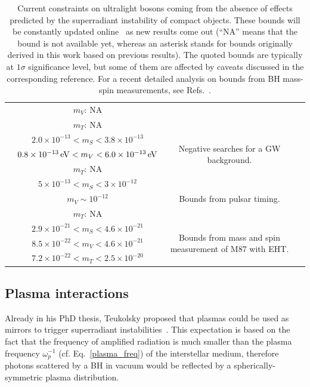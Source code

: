\documentclass[11pt]{article}
\numberwithin{equation}{section} %
\begin{document}
\begin{table}
\begin{tabular}{cccc}
&  ${m}_V$: NA     &   & \\
&  ${m}_T$: NA     &   & \\
    \hline
&  $2.0\times 10^{-13}<m_S<3.8\times 10^{-13}$    & \multirow{3}{*}{Negative searches for a GW background.}  &
\multirow{3}{*}{\cite{Brito:2017wnc,Brito:2017zvb,Tsukada:2018mbp,Tsukada:2020lgt}} \\
&  $0.8\times 10^{-13}\,{\rm eV}< m_V < 6.0\times 10^{-13} \,{\rm eV}$     &   & \\
&  ${m}_T$: NA     &   & \\
      \hline
&  $5\times 10^{-13}<{m}_S<3\times 10^{-12}$     & \multirow{3}{*}{Bounds from pulsar timing.}  &
\multirow{3}{*}{\cite{Cardoso:2017kgn,Kaplan:2019ako}} \\
&  ${m}_V\sim10^{-12}$     &   & \\
&  ${m}_T$: NA     &   & \\
  \hline
&  $2.9\times 10^{-21}<m_S<4.6\times 10^{-21}$ & \multirow{3}{*}{Bounds from mass and spin measurement of M87 with 
EHT.} 
 &
\multirow{3}{*}{\cite{Davoudiasl:2019nlo,Stott:2020gjj}} \\
& $8.5\times 10^{-22}<m_V<4.6\times 10^{-21}$     &   & \\
& $7.2\times 10^{-22}<m_T<2.5\times 10^{-20}$     &   & \\
  \hline
  \hline
 \end{tabular}
 \caption{Current constraints on ultralight bosons coming from 
the absence of effects predicted by the superradiant instability of compact objects. These bounds will be constantly 
updated online~\cite{webpage} as new results come out (``NA'' means that the bound is not available yet, whereas an 
asterisk stands for bounds originally derived in this work based on previous results). The 
quoted bounds are typically at $1\sigma$ significance level, but some of them are affected by caveats discussed in the 
corresponding reference. For a recent detailed analysis on bounds from BH mass-spin measurements, see Refs.~\cite{Stott:2020gjj,Unal:2020jiy}.
}\label{tab:bounds}
\end{table}


\subsection{Plasma interactions} \label{sec:astro_plasma}
Already in his PhD thesis, Teukolsky proposed that plasmas could be used as mirrors to trigger superradiant 
instabilities~\cite{teukolskythesis,Press:1972zz}. This expectation is based on the fact that the frequency of 
amplified radiation is much smaller than the plasma frequency $\omega_p^{-1}$ (cf. Eq.~\eqref{plasma_freq}) of the 
interstellar medium, therefore photons scattered by a BH in vacuum would be reflected by a spherically-symmetric plasma 
distribution.
\end{document}
